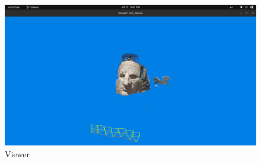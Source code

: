 \documentclass[a4paper, 12pt]{article}
\begin{document}
	\begin{figure}
		\caption{Viewer}
		\includegraphics[scale=0.25]{images/opencv_sfm02.png}
	\end{figure}
\end{document}
